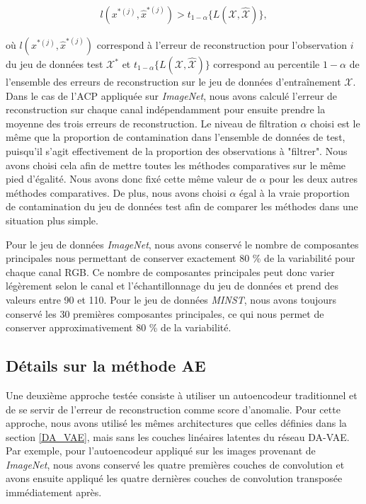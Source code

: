 \begin{gather} \label{eq:anomalie_mse}
l(x^{*(j)}, \hat{x}^{*(j)}) > t_{1-\alpha}\{L(\mathcal{X}, \hat{\mathcal{X}})\},
\end{gather}

où $l(x^{*(j)}, \hat{x}^{*(j)})$ correspond à l'erreur de reconstruction pour l'observation $i$ du jeu de données test $\mathcal{X^*}$ et $t_{1-\alpha}\{L(\mathcal{X}, \hat{\mathcal{X}})\}$ correspond au percentile $1-\alpha$ de l'ensemble des erreurs de reconstruction sur le jeu de données d'entraînement $\mathcal{X}$. Dans le cas de l'ACP appliquée sur \textit{ImageNet}, nous avons calculé l'erreur de reconstruction sur chaque canal indépendamment pour ensuite prendre la moyenne des trois erreurs de reconstruction. Le niveau de filtration $\alpha$ choisi est le même que la proportion de contamination dans l'ensemble de données de test, puisqu'il s'agit effectivement de la proportion des observations à "filtrer". Nous avons choisi cela afin de mettre toutes les méthodes comparatives sur le même pied d'égalité. Nous avons donc fixé cette même valeur de $\alpha$ pour les deux autres méthodes comparatives. De plus, nous avons choisi $\alpha$ égal à la vraie proportion de contamination du jeu de données test afin de comparer les méthodes dans une situation plus simple.

Pour le jeu de données \textit{ImageNet}, nous avons conservé le nombre de composantes principales nous permettant de conserver exactement 80 \% de la variabilité pour chaque canal RGB. Ce nombre de composantes principales peut donc varier légèrement selon le canal et l'échantillonnage du jeu de données et prend des valeurs entre 90 et 110. Pour le jeu de données \textit{MINST}, nous avons toujours conservé les 30 premières composantes principales, ce qui nous permet de conserver approximativement  80 \% de la variabilité. 

\subsection{Détails sur la méthode AE} \label{AE}

Une deuxième approche testée consiste à utiliser un autoencodeur traditionnel et de se servir de l'erreur de reconstruction comme score d'anomalie. Pour cette approche, nous avons utilisé les mêmes architectures que celles définies dans la section \ref{DA_VAE}, mais sans les couches linéaires latentes du réseau DA-VAE. Par exemple, pour l'autoencodeur appliqué sur les images provenant de \textit{ImageNet}, nous avons conservé les quatre premières couches de convolution et avons ensuite appliqué les quatre dernières couches de convolution transposée immédiatement après.

